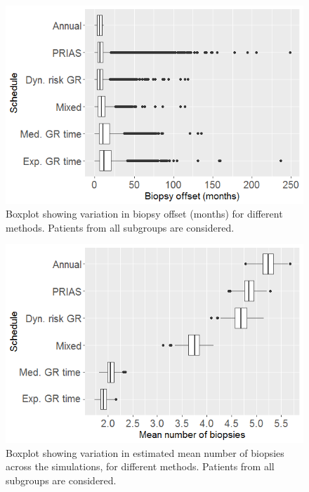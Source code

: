 \begin{figure}[!htb]
\centerline{\includegraphics[width=\columnwidth]{images/sim_study/offsetBoxPlot_all.png}}
\caption{Boxplot showing variation in biopsy offset (months) for different methods. Patients from all subgroups are considered.}
\label{fig : offsetBoxPlot_all}
\end{figure}

\begin{figure}[!htb]
\centerline{\includegraphics[width=\columnwidth]{images/sim_study/nbMeanBoxPlot_all.png}}
\caption{Boxplot showing variation in estimated mean number of biopsies across the simulations, for different methods. Patients from all subgroups are considered.}
\label{fig : nbMeanBoxPlot_all}
\end{figure}

